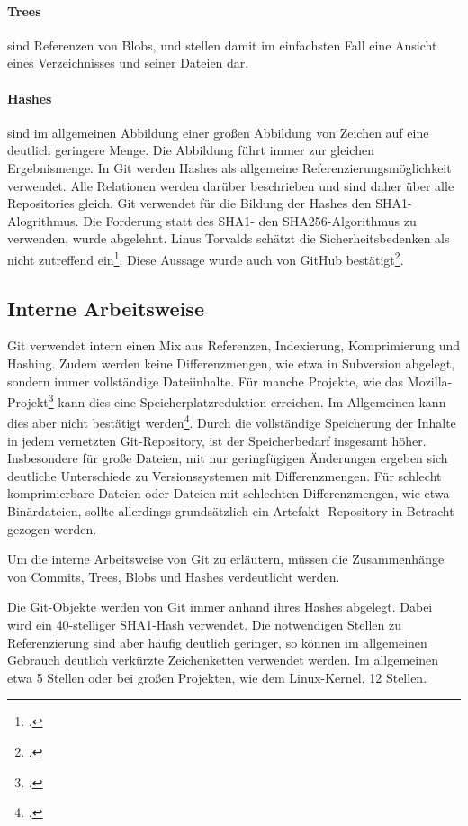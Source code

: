 \paragraph{Trees} sind Referenzen von Blobs, und stellen damit im einfachsten Fall eine Ansicht eines Verzeichnisses und 
seiner Dateien dar.

\paragraph{Hashes} sind im allgemeinen Abbildung einer großen Abbildung von Zeichen auf eine deutlich geringere Menge. 
Die Abbildung führt immer zur gleichen Ergebnismenge. In Git werden Hashes als allgemeine Referenzierungsmöglichkeit 
verwendet. Alle Relationen werden darüber beschrieben und sind daher über alle Repositories gleich. Git verwendet für die 
Bildung der Hashes den SHA1-Alogrithmus. Die Forderung statt des SHA1- den SHA256-Algorithmus zu verwenden, wurde 
abgelehnt. Linus Torvalds schätzt die Sicherheitsbedenken als nicht zutreffend ein\footcite[vgl.][]{git-sha-torvalds}. Diese 
Aussage wurde auch von GitHub bestätigt\footcite[vgl.][]{git-sha-github}.

\subsection{Interne Arbeitsweise}

Git verwendet intern einen Mix aus Referenzen, Indexierung, Komprimierung und Hashing. Zudem werden keine 
Differenzmengen, wie etwa in Subversion abgelegt, sondern immer vollständige Dateiinhalte. Für manche Projekte, wie das 
Mozilla-Projekt\footcite[vgl.][]{kernel-git-svn} kann dies eine Speicherplatzreduktion erreichen. Im Allgemeinen kann dies aber nicht bestätigt werden\footcite[vgl.][]{svn-vs-git}. Durch die vollständige Speicherung der Inhalte in jedem vernetzten Git-Repository, ist der Speicherbedarf insgesamt höher. Insbesondere für große Dateien, mit nur geringfügigen Änderungen ergeben sich deutliche Unterschiede zu Versionssystemen mit Differenzmengen. Für schlecht komprimierbare Dateien oder Dateien mit schlechten Differenzmengen, wie etwa Binärdateien, sollte allerdings grundsätzlich ein Artefakt-
Repository in Betracht gezogen werden.

Um die interne Arbeitsweise von Git zu erläutern, müssen die Zusammenhänge von Commits, Trees, Blobs und Hashes 
verdeutlicht werden.

Die Git-Objekte werden von Git immer anhand ihres Hashes abgelegt. Dabei wird ein 40-stelliger SHA1-Hash verwendet. Die 
notwendigen Stellen zu Referenzierung sind aber häufig deutlich geringer, so können im allgemeinen Gebrauch deutlich 
verkürzte Zeichenketten verwendet werden. Im allgemeinen etwa 5 Stellen oder bei großen Projekten, wie dem Linux-Kernel, 
12 Stellen.

